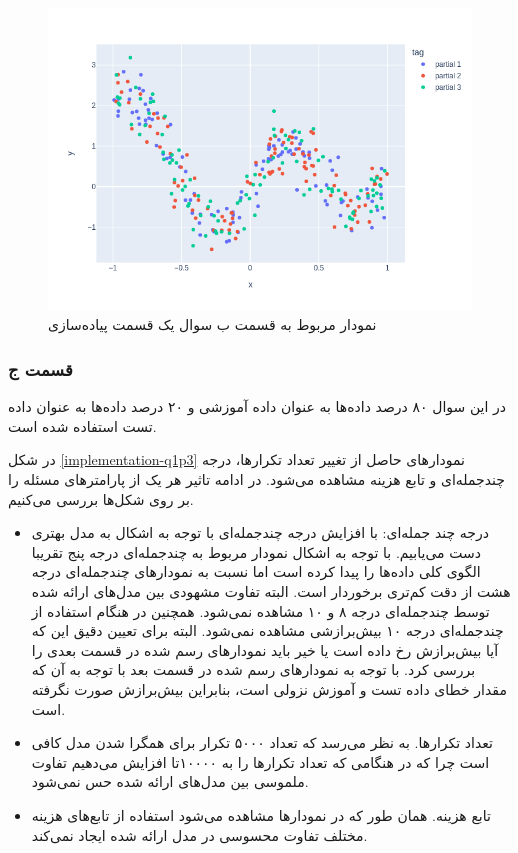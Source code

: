\documentclass[14pt,a4]{article}
\begin{document}
\begin{figure}[h]
    \centering
    \includegraphics[width=\linewidth]{images/implementation/q1/p2.png}
    \caption{نمودار مربوط به قسمت ب سوال یک قسمت پیاده‌سازی}
    \label{implementation-q1p2}
\end{figure}

\newpage

\subsubsection*{قسمت ج}

در این سوال ۸۰ درصد داده‌ها به عنوان داده آموزشی و ۲۰ درصد داده‌ها به عنوان داده تست استفاده شده است.

در شکل \ref{implementation-q1p3} نمودار‌های حاصل از تغییر تعداد تکرار‌ها، درجه چندجمله‌ای و تابع هزینه
مشاهده می‌شود. در ادامه تاثیر هر یک از پارامتر‌های مسئله را بر روی شکل‌ها بررسی می‌کنیم.

\begin{itemize}
    \item درجه چند جمله‌ای:‌ با افزایش درجه چندجمله‌ای با توجه به اشکال به مدل بهتری دست می‌یابیم.
    با توجه به اشکال نمودار مربوط به چندجمله‌ای درجه پنج تقریبا الگوی کلی داده‌ها را پیدا کرده است اما نسبت به
    نمودار‌های چندجمله‌ای درجه هشت از دقت کم‌تری برخوردار است. البته تفاوت مشهودی بین مدل‌های ارائه شده
    توسط چندجمله‌ای درجه ۸ و ۱۰ مشاهده نمی‌شود. همچنین در هنگام استفاده از چندجمله‌ای درجه ۱۰ بیش‌برازشی مشاهده نمی‌شود.
    البته برای تعیین دقیق این که آیا بیش‌برازش رخ داده است یا خیر باید نمودا‌ر‌های رسم شده در قسمت بعدی را بررسی کرد.
    با توجه به نمودار‌های رسم شده در قسمت بعد با توجه به آن که مقدار خطای داده تست و آموزش  نزولی است،
    بنابراین بیش‌برازش صورت نگرفته است.

    \item تعداد تکرار‌ها. به نظر می‌رسد که تعداد ۵۰۰۰ تکرار برای همگرا شدن مدل کافی است چرا که در هنگامی که
    تعداد تکرار‌ها را به ۱۰۰۰۰تا افزایش می‌دهیم تفاوت ملموسی بین مدل‌های ارائه شده حس نمی‌شود.

    \item تابع هزینه. همان طور که در نمودار‌ها مشاهده می‌شود استفاده از تابع‌های هزینه مختلف تفاوت محسوسی در
    مدل ارائه شده ایجاد نمی‌کند.

\end{itemize}
\end{document}
